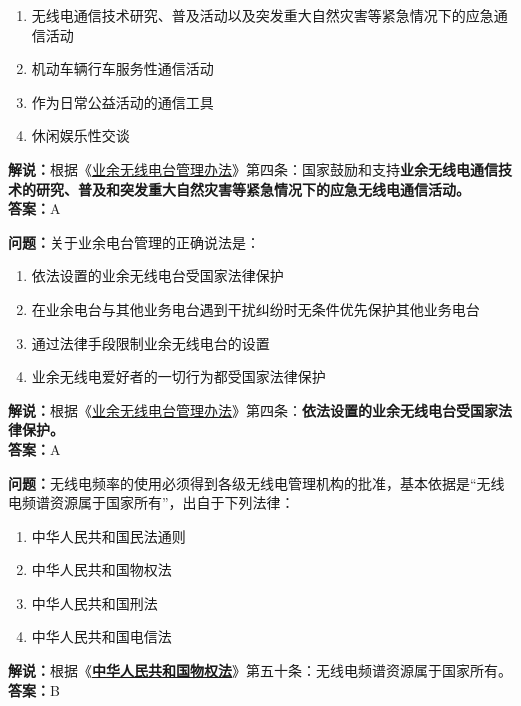 \begin{enumerate}[label=\Alph*), leftmargin=1cm]
	\item 无线电通信技术研究、普及活动以及突发重大自然灾害等紧急情况下的应急通信活动
	\item 机动车辆行车服务性通信活动
	\item 作为日常公益活动的通信工具
	\item 休闲娱乐性交谈
\end{enumerate}

\textbf{解说：}根据《\href{https://www.miit.gov.cn/jgsj/zfs/bmgz/art/2020/art_147b69815b3641caad9047735f94c860.html}{业余无线电台管理办法}》第四条：国家鼓励和支持\textbf{业余无线电通信技术的研究、普及和突发重大自然灾害等紧急情况下的应急无线电通信活动。}\\\textbf{答案：}A


\textbf{问题：}关于业余电台管理的正确说法是：

\begin{enumerate}[label=\Alph*), leftmargin=1cm]
	\item 依法设置的业余无线电台受国家法律保护
	\item 在业余电台与其他业务电台遇到干扰纠纷时无条件优先保护其他业务电台
	\item 通过法律手段限制业余无线电台的设置
	\item 业余无线电爱好者的一切行为都受国家法律保护
\end{enumerate}

\textbf{解说：}根据《\href{https://www.miit.gov.cn/jgsj/zfs/bmgz/art/2020/art_147b69815b3641caad9047735f94c860.html}{业余无线电台管理办法}》第四条：\textbf{依法设置的业余无线电台受国家法律保护。}\\\textbf{答案：}A


\textbf{问题：}无线电频率的使用必须得到各级无线电管理机构的批准，基本依据是“无线电频谱资源属于国家所有”，出自于下列法律：

\begin{enumerate}[label=\Alph*), leftmargin=1cm]
	\item 中华人民共和国民法通则
	\item 中华人民共和国物权法
	\item 中华人民共和国刑法
	\item 中华人民共和国电信法
\end{enumerate}

\textbf{解说：}根据《\href{http://www.gov.cn/flfg/2007-03/19/content_554452.htm}{\textbf{中华人民共和国物权法}}》第五十条：无线电频谱资源属于国家所有。\\\textbf{答案：}B


